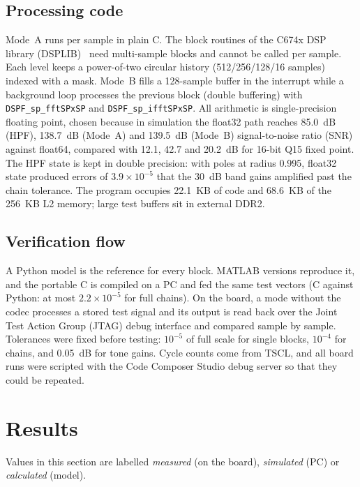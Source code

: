 \documentclass[conference]{IEEEtran}
\begin{document}
\subsection{Processing code}
Mode~A runs per sample in plain C. The block routines of the C674x DSP library (DSPLIB)~\cite{ti_dsplib674} need multi-sample blocks and cannot be called per sample. Each level keeps a power-of-two circular history (512/256/128/16 samples) indexed with a mask. Mode~B fills a 128-sample buffer in the interrupt while a background loop processes the previous block (double buffering) with \texttt{DSPF\_sp\_fftSPxSP} and \texttt{DSPF\_sp\_ifftSPxSP}. All arithmetic is single-precision floating point, chosen because in simulation the float32 path reaches 85.0~dB (HPF), 138.7~dB (Mode~A) and 139.5~dB (Mode~B) signal-to-noise ratio (SNR) against float64, compared with 12.1, 42.7 and 20.2~dB for 16-bit Q15 fixed point. The HPF state is kept in double precision: with poles at radius 0.995, float32 state produced errors of $3.9\times10^{-5}$ that the 30~dB band gains amplified past the chain tolerance. The program occupies 22.1~KB of code and 68.6~KB of the 256~KB L2 memory; large test buffers sit in external DDR2.

\subsection{Verification flow}
A Python model is the reference for every block. MATLAB versions reproduce it, and the portable C is compiled on a PC and fed the same test vectors (C against Python: at most $2.2\times10^{-5}$ for full chains). On the board, a mode without the codec processes a stored test signal and its output is read back over the Joint Test Action Group (JTAG) debug interface and compared sample by sample. Tolerances were fixed before testing: $10^{-5}$ of full scale for single blocks, $10^{-4}$ for chains, and 0.05~dB for tone gains. Cycle counts come from TSCL, and all board runs were scripted with the Code Composer Studio debug server so that they could be repeated.

\section{Results}\label{sec:results}
Values in this section are labelled \emph{measured} (on the board), \emph{simulated} (PC) or \emph{calculated} (model).
\end{document}
